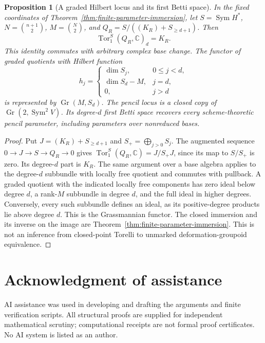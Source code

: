 \documentclass[11pt,reqno]{amsart}
\numberwithin{equation}{section}
\newtheorem{proposition}[theorem]{Proposition}
\theoremstyle{definition}\newtheorem{definition}[theorem]{Definition}
\theoremstyle{remark}\newtheorem{remark}[theorem]{Remark}
\newcommand{\C}{\mathbb C}\newcommand{\Q}{\mathbb Q}
\DeclareMathOperator{\Sym}{Sym}\DeclareMathOperator{\Gr}{Gr}
\DeclareMathOperator{\Tor}{Tor}\DeclareMathOperator{\im}{im}
\begin{document}
\begin{proposition}[A graded Hilbert locus and its first Betti space]
\label{prop:first-syzygy-hilbert}
In the fixed coordinates of Theorem~\ref{thm:finite-parameter-immersion},
let \(S=\Sym H^*\), \(N=\binom{n+1}{2}\), \(M=\binom N2\),
and \(Q_R=S/((K_R)+S_{\ge d+1})\). Then
\begin{equation}\label{eq:first-relation-tor}
                     \Tor_1^S(Q_R,\C)_d=K_R.
\end{equation}
This identity commutes with arbitrary complex base change.
The functor of graded quotients with Hilbert function
\[
 h_j=\begin{cases}\dim S_j,&0\le j<d,\\
 \dim S_d-M,&j=d,\\0,&j>d\end{cases}
\]
is represented by \(\Gr(M,S_d)\). The pencil locus is a closed
copy of \(\Gr(2,\Sym^2V)\). Its degree-\(d\) first Betti
space recovers every scheme-theoretic pencil parameter, including
parameters over nonreduced bases.
\end{proposition}
\begin{proof}
Put \(J=(K_R)+S_{\ge d+1}\) and \(S_+=\bigoplus_{j>0}S_j\).
The augmented sequence \(0\to J\to S\to Q_R\to0\) gives
\(\Tor_1^S(Q_R,\C)=J/S_+J\), since its map to \(S/S_+\)
is zero. Its degree-\(d\) part is \(K_R\). The same argument
over a base algebra applies to the degree-\(d\) subbundle with
locally free quotient and commutes with pullback.
A graded quotient with the indicated locally free components has
zero ideal below degree \(d\), a rank-\(M\) subbundle in degree
\(d\), and the full ideal in higher degrees. Conversely, every
such subbundle defines an ideal, as its positive-degree products lie
above degree \(d\). This is the Grassmannian functor. The closed
immersion and its inverse on the image are
Theorem~\ref{thm:finite-parameter-immersion}. This is not an inference
from closed-point Torelli to unmarked deformation-groupoid equivalence.
\end{proof}

\section*{Acknowledgment of assistance}
AI assistance was used in developing and drafting the arguments and
finite verification scripts.  All structural proofs are supplied for
independent mathematical scrutiny; computational receipts are not
formal proof certificates.  No AI system is listed as an author.
\end{document}
